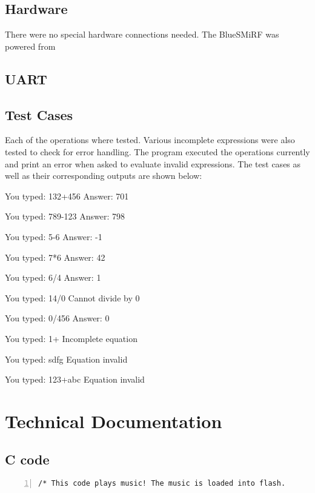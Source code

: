 \documentclass[11pt]{article}
\begin{document}
\subsection{Hardware}
There were no special hardware connections needed. The BlueSMiRF was powered from 


\subsection{UART}


\subsection{Test Cases}
Each of the operations where tested. Various incomplete expressions were also tested to check for error handling. The program executed the operations currently and print an error when asked to evaluate invalid expressions. The test cases as well as their corresponding outputs are shown below:


You typed: 132+456
Answer: 701

You typed: 789-123
Answer: 798

You typed: 5-6
Answer: -1

You typed: 7*6
Answer: 42

You typed: 6/4
Answer: 1

You typed: 14/0
Cannot divide by 0

You typed: 0/456
Answer: 0

You typed: 1+
Incomplete equation

You typed: sdfg
Equation invalid

You typed: 123+abc
Equation invalid



\clearpage

\section{Technical Documentation}

\subsection{C code}

\begin{lstlisting}[numbers=left,basicstyle=\footnotesize]
/* This code plays music! The music is loaded into flash.

\end{lstlisting}
\end{document}
